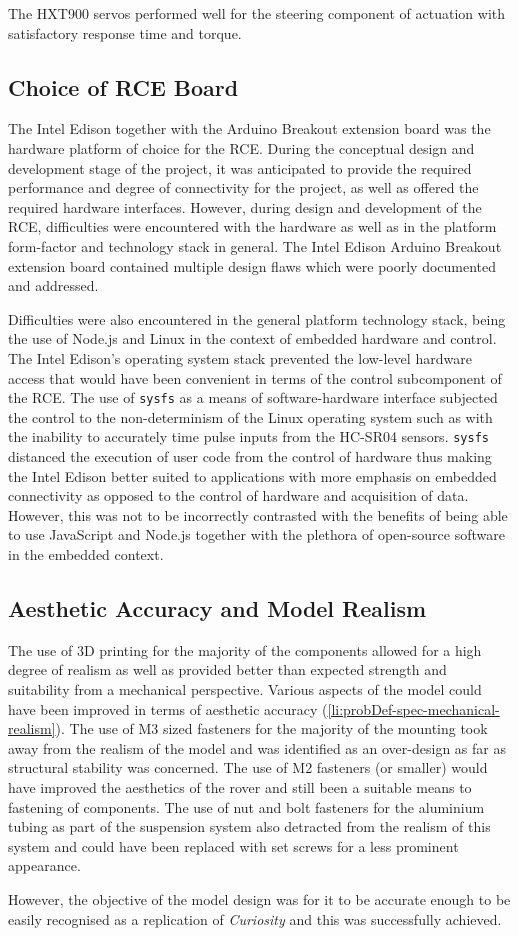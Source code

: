     The HXT900 servos performed well for the steering component of actuation with satisfactory response time and torque.
  
  \subsection{Choice of RCE Board}
    \label{subsec:rec-choiceOfRCEBoard}
    The Intel Edison together with the Arduino Breakout extension board was the hardware platform of choice for the RCE. During the conceptual design and development stage of the project, it was anticipated to provide the required performance and degree of connectivity for the project, as well as offered the required hardware interfaces. However, during design and development of the RCE, difficulties were encountered with the hardware as well as in the platform form-factor and technology stack in general. The Intel Edison Arduino Breakout extension board contained multiple design flaws which were poorly documented and addressed.
    
    Difficulties were also encountered in the general platform technology stack, being the use of Node.js and Linux in the context of embedded hardware and control. The Intel Edison's operating system stack prevented the low-level hardware access that would have been convenient in terms of the control subcomponent of the RCE. The use of \texttt{sysfs} as a means of software-hardware interface subjected the control to the non-determinism of the Linux operating system such as with the inability to accurately time pulse inputs from the HC-SR04 sensors. \texttt{sysfs} distanced the execution of user code from the control of hardware thus making the Intel Edison better suited to applications with more emphasis on embedded connectivity as opposed to the control of hardware and acquisition of data. However, this was not to be incorrectly contrasted with the benefits of being able to use JavaScript and Node.js together with the plethora of open-source software in the embedded context.
  
  \subsection{Aesthetic Accuracy and Model Realism}
  \label{subsec:rec-aesthetics}
    The use of 3D printing for the majority of the components allowed for a high degree of realism as well as provided better than expected strength and suitability from a mechanical perspective. Various aspects of the model could have been improved in terms of aesthetic accuracy (\ref{li:probDef-spec-mechanical-realism}). The use of M3 sized fasteners for the majority of the mounting took away from the realism of the model and was identified as an over-design as far as structural stability was concerned. The use of M2 fasteners (or smaller) would have improved the aesthetics of the rover and still been a suitable means to fastening of components. The use of nut and bolt fasteners for the aluminium tubing as part of the suspension system also detracted from the realism of this system and could have been replaced with set screws for a less prominent appearance.
    
    However, the objective of the model design was for it to be accurate enough to be easily recognised as a replication of \textit{Curiosity} and this was successfully achieved.
  